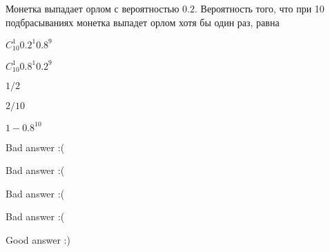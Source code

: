 
\begin{question}
Монетка выпадает орлом с вероятностью \(0.2\). Вероятность того, что при
10 подбрасываниях монетка выпадет орлом хотя бы один раз, равна
\begin{answerlist}
  \item \(C_{10}^1 0.2^{1}0.8^9\)
  \item \(C_{10}^1 0.8^{1}0.2^9\)
  \item \(1/2\)
  \item \(2/10\)
  \item \(1 - 0.8^{10}\)
\end{answerlist}
\end{question}

\begin{solution}
\begin{answerlist}
  \item Bad answer :(
  \item Bad answer :(
  \item Bad answer :(
  \item Bad answer :(
  \item Good answer :)
\end{answerlist}
\end{solution}

